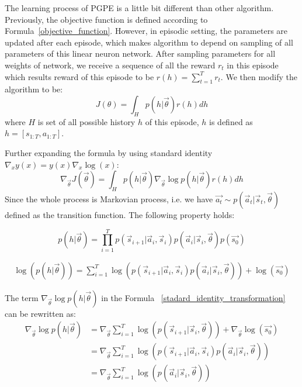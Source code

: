\documentclass[officiallayout]{tktla}
\begin{document}
The learning process of PGPE is a little bit different than other algorithm. Previously, the objective function is defined according to Formula~\ref{objective_function}. However, in episodic setting, the parameters are updated after each episode, which makes algorithm to depend on sampling of all parameters of this linear neuron network. After sampling parameters for all weights of network, we receive a sequence of all the reward $r_t$ in this episode which results reward of this episode to be $r(h) = \sum_{t=1}^T r_t$. We then modify the algorithm to be:
\begin{equation}
J(\theta) = \int_H p(h|\vec{\theta})r(h)dh
\end{equation}
where $H$ is set of all possible history $h$ of this episode, $h$ is defined as $h = [s_{1:T}, a_{1:T}]$.

Further expanding the formula by using standard identity $\nabla_x y(x) = y(x) \nabla_x \log(x)$:
\begin{equation}
\nabla_{\vec{\theta}} J(\vec{\theta}) = \int_H p(h|\vec{\theta}) \nabla_{\vec{\theta}} \log p(h|\vec{\theta})r(h)dh
\label{stadard_identity_transformation}
\end{equation}
Since the whole process is Markovian process, i.e. we have $ \vec{a_{t}}\sim p(\vec{a}_{t}|\vec{s}_{t},\vec{\theta})$ defined as the transition function. The following property holds: 

\begin{equation}
p(h|\vec{\theta}) = \prod_{i=1}^Tp(\vec{s}_{i+1}|\vec{a}_i, \vec{s}_i)p(\vec{a}_{i}|\vec{s}_{i}, \vec{\theta})p(\vec{s_0})
\label{markov_property}
\end{equation}

\begin{align}
\log(p(h|\vec{\theta})) = \sum_{i=1}^T\log(p(\vec{s}_{i+1}|\vec{a}_i, \vec{s}_i)p(\vec{a}_{i}|\vec{s}_{i}, \vec{\theta})) + \log(\vec{s_0})
\label{log_markov_property}
\end{align}

The term $\nabla_{\vec{\theta}} \log p(h|\vec{\theta})$ in the Formula ~\ref{stadard_identity_transformation} can be rewritten as:
\begin{align}
\nabla_{\vec{\theta}} \log p(h|\vec{\theta})  &= \nabla_{\vec{\theta}} \sum_{i=1}^T\log(p(\vec{s}_{i+1}|\vec{s}_{i}, \vec{\theta})) + \nabla_{\vec{\theta}} \log(\vec{s_0}) \\
&= \nabla_{\vec{\theta}} \sum_{i=1}^T\log(p(\vec{s}_{i+1}|\vec{a}_i, \vec{s}_i)p(\vec{a}_{i}|\vec{s}_{i}, \vec{\theta})) \\
&= \nabla_{\vec{\theta}} \sum_{i=1}^T\log(p(\vec{a}_{i}|\vec{s}_{i}, \vec{\theta}))
\label{expansion_of_log_history}
\end{align}
\end{document}
